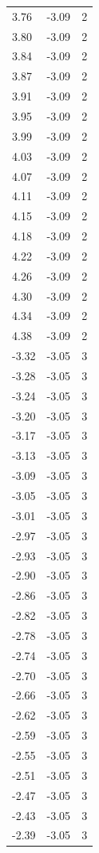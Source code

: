 \begin{longtable}{lrr}
  3.76 & -3.09 & 2 \\
  3.80 & -3.09 & 2 \\
  3.84 & -3.09 & 2 \\
  3.87 & -3.09 & 2 \\
  3.91 & -3.09 & 2 \\
  3.95 & -3.09 & 2 \\
  3.99 & -3.09 & 2 \\
  4.03 & -3.09 & 2 \\
  4.07 & -3.09 & 2 \\
  4.11 & -3.09 & 2 \\
  4.15 & -3.09 & 2 \\
  4.18 & -3.09 & 2 \\
  4.22 & -3.09 & 2 \\
  4.26 & -3.09 & 2 \\
  4.30 & -3.09 & 2 \\
  4.34 & -3.09 & 2 \\
  4.38 & -3.09 & 2 \\
  -3.32 & -3.05 & 3 \\
  -3.28 & -3.05 & 3 \\
  -3.24 & -3.05 & 3 \\
  -3.20 & -3.05 & 3 \\
  -3.17 & -3.05 & 3 \\
  -3.13 & -3.05 & 3 \\
  -3.09 & -3.05 & 3 \\
  -3.05 & -3.05 & 3 \\
  -3.01 & -3.05 & 3 \\
  -2.97 & -3.05 & 3 \\
  -2.93 & -3.05 & 3 \\
  -2.90 & -3.05 & 3 \\
  -2.86 & -3.05 & 3 \\
  -2.82 & -3.05 & 3 \\
  -2.78 & -3.05 & 3 \\
  -2.74 & -3.05 & 3 \\
  -2.70 & -3.05 & 3 \\
  -2.66 & -3.05 & 3 \\
  -2.62 & -3.05 & 3 \\
  -2.59 & -3.05 & 3 \\
  -2.55 & -3.05 & 3 \\
  -2.51 & -3.05 & 3 \\
  -2.47 & -3.05 & 3 \\
  -2.43 & -3.05 & 3 \\
  -2.39 & -3.05 & 3 \\

\end{longtable}
